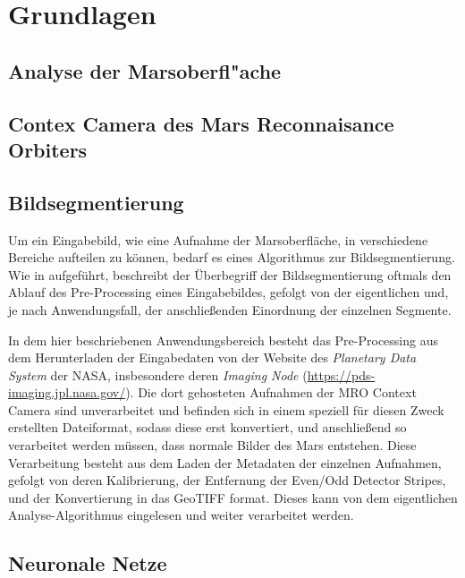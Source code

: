 \chapter{Grundlagen}
\label{chap:grundlagen}

\section{Analyse der Marsoberfl"ache}
\label{sec:analysedermarsoberflache}


\section{Contex Camera des Mars Reconnaisance Orbiters}
\label{sec:mroctx}

\section{Bildsegmentierung}
\label{sec:segmentierung}

Um ein Eingabebild, wie \zB eine Aufnahme der Marsoberfläche, in verschiedene Bereiche aufteilen zu können, bedarf es eines Algorithmus zur Bildsegmentierung. Wie in \cite{bildsegmentierung} aufgeführt, beschreibt der Überbegriff der Bildsegmentierung oftmals den Ablauf des Pre-Processing eines Eingabebildes, gefolgt von der eigentlichen  und, je nach Anwendungsfall, der anschließenden Einordnung der einzelnen Segmente.

In dem hier beschriebenen Anwendungsbereich besteht das Pre-Processing aus dem Herunterladen der Eingabedaten von der Website des \textit{Planetary Data System} der NASA, insbesondere deren \textit{Imaging Node} (\hyperlink{https://pds-imaging.jpl.nasa.gov/}{https://pds-imaging.jpl.nasa.gov/}). Die dort gehosteten Aufnahmen der MRO Context Camera sind unverarbeitet und befinden sich in einem speziell für diesen Zweck erstellten Dateiformat, %
sodass diese erst konvertiert, und anschließend so verarbeitet werden müssen, dass normale Bilder des Mars entstehen.
Diese Verarbeitung besteht aus dem Laden der Metadaten der einzelnen Aufnahmen, gefolgt von deren Kalibrierung, der Entfernung der Even/Odd Detector Stripes, und der Konvertierung in das GeoTIFF format. Dieses kann von dem eigentlichen Analyse-Algorithmus eingelesen und weiter verarbeitet werden.

\section{Neuronale Netze}
\label{sec:neuronalenetze}